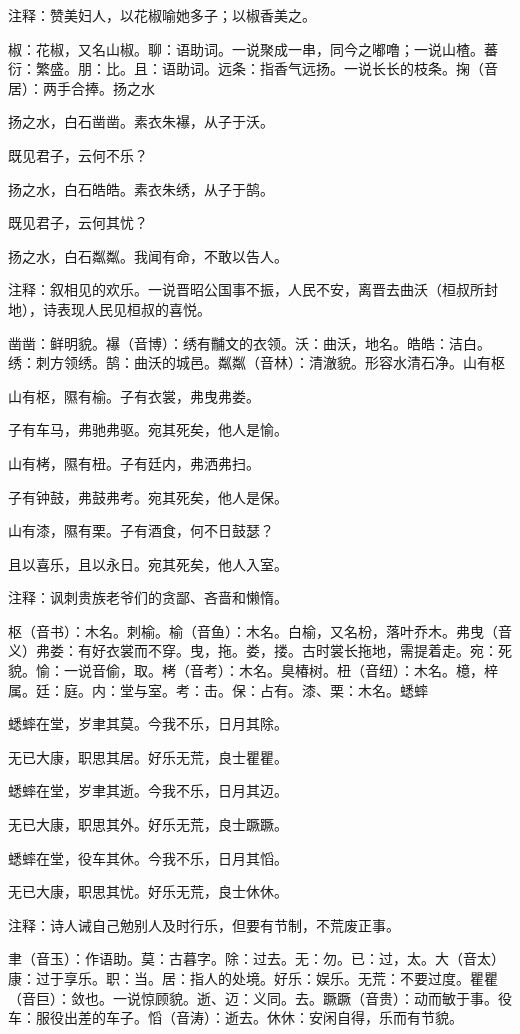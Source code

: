 \documentclass[12pt,UTF8]{ctexbook}
\begin{document}
注释：赞美妇人，以花椒喻她多子；以椒香美之。

椒：花椒，又名山椒。聊：语助词。一说聚成一串，同今之嘟噜；一说山楂。蕃衍：繁盛。朋：比。且：语助词。远条：指香气远扬。一说长长的枝条。掬（音居）：两手合捧。扬之水

扬之水，白石凿凿。素衣朱襮，从子于沃。

既见君子，云何不乐？

扬之水，白石皓皓。素衣朱绣，从子于鹄。

既见君子，云何其忧？

扬之水，白石粼粼。我闻有命，不敢以告人。

注释：叙相见的欢乐。一说晋昭公国事不振，人民不安，离晋去曲沃（桓叔所封地），诗表现人民见桓叔的喜悦。

凿凿：鲜明貌。襮（音博）：绣有黼文的衣领。沃：曲沃，地名。皓皓：洁白。绣：刺方领绣。鹄：曲沃的城邑。粼粼（音林）：清澈貌。形容水清石净。山有枢

山有枢，隰有榆。子有衣裳，弗曳弗娄。

子有车马，弗驰弗驱。宛其死矣，他人是愉。

山有栲，隰有杻。子有廷内，弗洒弗扫。

子有钟鼓，弗鼓弗考。宛其死矣，他人是保。

山有漆，隰有栗。子有酒食，何不日鼓瑟？

且以喜乐，且以永日。宛其死矣，他人入室。

注释：讽刺贵族老爷们的贪鄙、吝啬和懒惰。

枢（音书）：木名。刺榆。榆（音鱼）：木名。白榆，又名枌，落叶乔木。弗曳（音义）弗娄：有好衣裳而不穿。曳，拖。娄，搂。古时裳长拖地，需提着走。宛：死貌。愉：一说音偷，取。栲（音考）：木名。臭椿树。杻（音纽）：木名。檍，梓属。廷：庭。内：堂与室。考：击。保：占有。漆、栗：木名。蟋蟀

蟋蟀在堂，岁聿其莫。今我不乐，日月其除。

无已大康，职思其居。好乐无荒，良士瞿瞿。

蟋蟀在堂，岁聿其逝。今我不乐，日月其迈。

无已大康，职思其外。好乐无荒，良士蹶蹶。

蟋蟀在堂，役车其休。今我不乐，日月其慆。

无已大康，职思其忧。好乐无荒，良士休休。

注释：诗人诫自己勉别人及时行乐，但要有节制，不荒废正事。

聿（音玉）：作语助。莫：古暮字。除：过去。无：勿。已：过，太。大（音太）康：过于享乐。职：当。居：指人的处境。好乐：娱乐。无荒：不要过度。瞿瞿（音巨）：敛也。一说惊顾貌。逝、迈：义同。去。蹶蹶（音贵）：动而敏于事。役车：服役出差的车子。慆（音涛）：逝去。休休：安闲自得，乐而有节貌。
\end{document}

